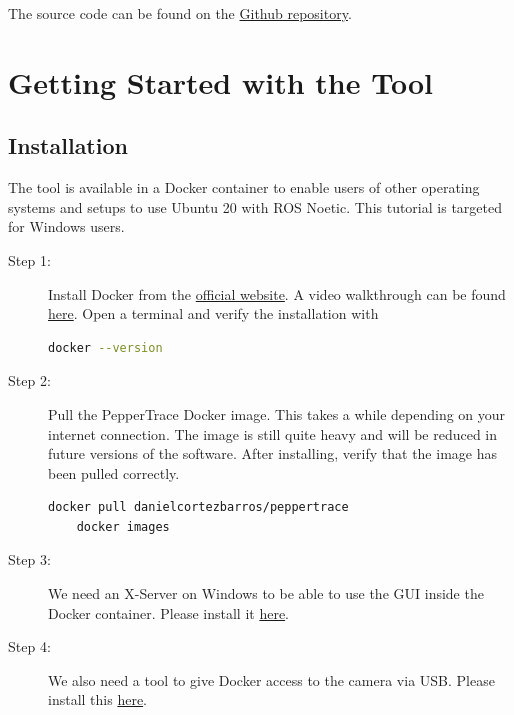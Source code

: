 \documentclass{CSSRforAfrica}
\begin{document}
The source code can be found on the \href{https://github.com/danielcortezbarros/peppertrace}{Github repository}. 

\newpage
 
 
\pagebreak
\tableofcontents
\newpage


\section{Getting Started with the Tool}
\subsection{Installation}
The tool is available in a Docker container to enable users of other operating systems and setups to use Ubuntu 20 with ROS Noetic. This tutorial is targeted for Windows users.


\begin{description}
    \item[Step 1:] Install Docker from the \href{https://docs.docker.com/desktop/setup/install/windows-install/}{official website}. A video walkthrough can be found \href{https://www.youtube.com/watch?v=WDEdRmTCSs8}{here}. Open a terminal and verify the installation with 
        \begin{lstlisting}[style=withoutNumbering, language=bash]
    docker --version
        \end{lstlisting}
    \item[Step 2:] Pull the PepperTrace Docker image. This takes a while depending on your internet connection. The image is still quite heavy and will be reduced in future versions of the software. After installing, verify that the image has been pulled correctly.
        \begin{lstlisting}[style=withoutNumbering, language=bash]
    docker pull danielcortezbarros/peppertrace
    docker images
        \end{lstlisting}
    \item[Step 3:] We need an X-Server on Windows to be able to use the GUI inside the Docker container. Please install it \href{https://sourceforge.net/projects/vcxsrv/}{here}. 
    \item[Step 4:] We also need a tool to give Docker access to the camera via USB. Please install this \href{https://github.com/dorssel/usbipd-win/releases/tag/v4.3.0}{here}.
        
\end{description}
\end{document}

